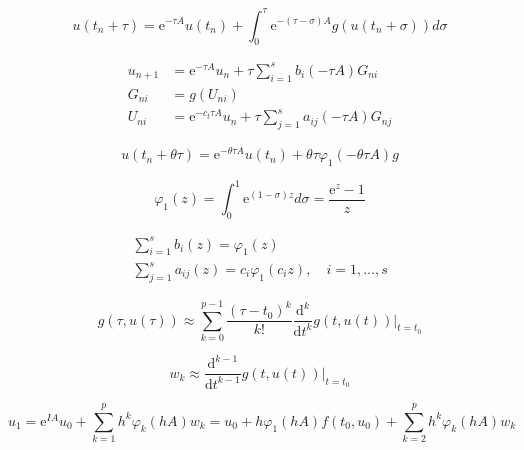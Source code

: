 \begin{equation} 
    u\left(t_{n}+\tau\right)=\mathrm{e}^{-\tau A} u\left(t_{n}\right)+\int_{0}^{\tau} \mathrm{e}^{-(\tau-\sigma) A} g\left(u\left(t_{n}+\sigma\right)\right) d \sigma
\end{equation}

\begin{equation} 
    \begin{aligned} u_{n+1} &=\mathrm{e}^{-\tau A} u_{n}+\tau \sum_{i=1}^{s} b_{i}(-\tau A) G_{n i} \\ G_{n i} &=g\left(U_{n i}\right) \\ U_{n i} &=\mathrm{e}^{-c_{t} \tau A} u_{n}+\tau \sum_{j=1}^{s} a_{i j}(-\tau A) G_{n j} \end{aligned}
\end{equation}

\begin{equation} 
    u\left(t_{n}+\theta \tau\right)=\mathrm{e}^{-\theta \tau A} u\left(t_{n}\right)+\theta \tau \varphi_{1}(-\theta \tau A) g
\end{equation}

\begin{equation} 
    \varphi_{1}(z)=\int_{0}^{1} \mathrm{e}^{(1-\sigma) z} d \sigma=\frac{\mathrm{e}^{z}-1}{z}
\end{equation}

\begin{equation} 
    \begin{array}{l}{\sum_{i=1}^{s} b_{i}(z)=\varphi_{1}(z)} \\ {\sum_{j=1}^{s} a_{i j}(z)=c_{i} \varphi_{1}\left(c_{i} z\right), \quad i=1, \ldots, s}\end{array}
\end{equation}

\begin{equation} 
    g(\tau, u(\tau)) \approx \sum_{k=0}^{p-1} \frac{\left(\tau-t_{0}\right)^{k}}{k !} \frac{\mathrm{d}^{k}}{\mathrm{d} t^{k}} g\left.(t, u(t))\right|_{t=t_{0}}
\end{equation}

\begin{equation} 
    w_{k} \approx \frac{\mathrm{d}^{k-1}}{\mathrm{d} t^{k-1}} g\left.(t, u(t))\right|_{t=t_{0}}
\end{equation}

\begin{equation} 
    u_{1}=\mathrm{e}^{I A} u_{0}+\sum_{k=1}^{p} h^{k} \varphi_{k}(h A) w_{k} = u_{0}+h \varphi_{1}(h A) f\left(t_{0}, u_{0}\right)+\sum_{k=2}^{p} h^{k} \varphi_{k}(h A) w_{k}
\end{equation}

